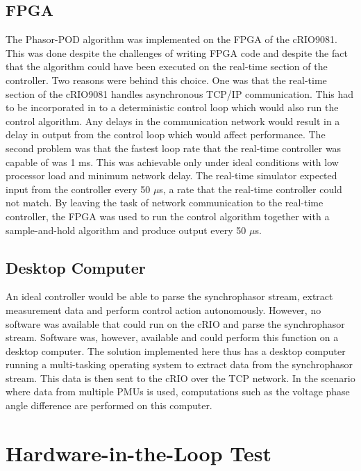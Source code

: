 \documentclass[conference]{IEEEtran}
\begin{document}
\subsection{FPGA} The Phasor-POD algorithm was implemented on the FPGA of the cRIO9081. This was done despite the challenges of writing FPGA code and despite the fact that the algorithm could have been executed on the real-time section of the controller. Two reasons were behind this choice. One was that the real-time section of the cRIO9081 handles asynchronous TCP/IP communication. This had to be incorporated in to a deterministic control loop which would also run the control algorithm. Any delays in the communication network would result in a delay in output from the control loop which would affect performance. The second problem was that the fastest loop rate that the real-time controller was capable of was 1 ms. This was achievable only under ideal conditions with low processor load and minimum network delay. The real-time simulator expected input from the controller every 50 $\mu$s, a rate that the real-time controller could not match. By leaving the task of network communication to the real-time controller, the FPGA was used to run the control algorithm together with a sample-and-hold algorithm and produce output every 50 $\mu$s.

\subsection{Desktop Computer} An ideal controller would be able to parse the synchrophasor stream, extract measurement data and perform control action autonomously. However, no software was available that could run on the cRIO and parse the synchrophasor stream. Software \cite{SDK} was, however, available and could perform this function on a desktop computer. The solution implemented here thus has a desktop computer running a multi-tasking operating system to extract data from the synchrophasor stream. This data is then sent to the cRIO over the TCP network. In the scenario where data from multiple PMUs is used, computations such as the voltage phase angle difference are performed on this computer.

\section{Hardware-in-the-Loop Test} \label{HILtest}
\end{document}
